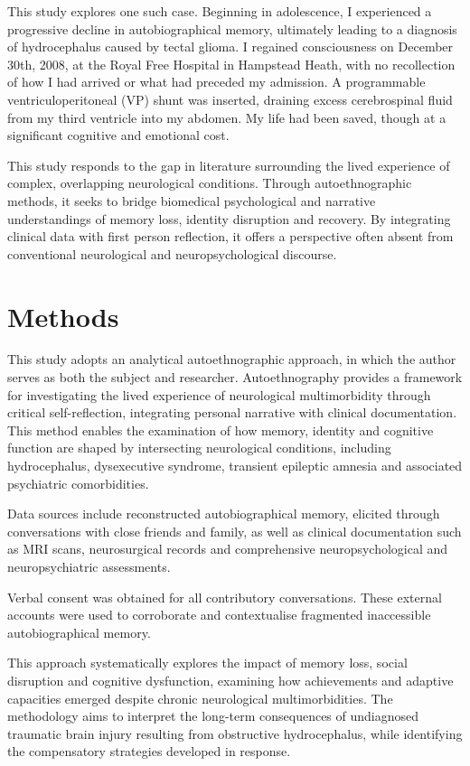 \documentclass{article}
\begin{document}
This study explores one such case. Beginning in adolescence, I experienced a progressive decline in autobiographical memory, ultimately leading to a diagnosis of hydrocephalus caused by tectal glioma. I regained consciousness on December 30th, 2008, at the Royal Free Hospital in Hampstead Heath, with no recollection of how I had arrived or what had preceded my admission. A programmable ventriculoperitoneal (VP) shunt was inserted, draining excess cerebrospinal fluid from my third ventricle into my abdomen. My life had been saved, though at a significant cognitive and emotional cost.

This study responds to the gap in literature surrounding the lived experience of complex, overlapping neurological conditions. Through autoethnographic methods, it seeks to bridge biomedical psychological and narrative understandings of memory loss, identity disruption and recovery. By integrating clinical data with first person reflection, it offers a perspective often absent from conventional neurological and neuropsychological discourse.

\section*{Methods}
This study adopts an analytical autoethnographic approach, in which the author serves as both the subject and researcher. Autoethnography provides a framework for investigating the lived experience of neurological multimorbidity through critical self-reflection, integrating personal narrative with clinical documentation. This method enables the examination of how memory, identity and cognitive function are shaped by intersecting
neurological conditions, including hydrocephalus, dysexecutive syndrome, transient epileptic amnesia and associated psychiatric comorbidities.

Data sources include reconstructed autobiographical memory, elicited through conversations with close friends and family, as well as clinical documentation such as MRI scans, neurosurgical records and comprehensive neuropsychological and neuropsychiatric assessments.

Verbal consent was obtained for all contributory conversations. These external accounts were used to corroborate and contextualise fragmented inaccessible autobiographical memory.

This approach systematically explores the impact of memory loss, social disruption and cognitive dysfunction, examining how achievements and adaptive capacities emerged despite chronic neurological multimorbidities. The methodology aims to interpret the long-term consequences of undiagnosed traumatic brain injury resulting from obstructive hydrocephalus, while identifying the compensatory strategies developed in response.
\end{document}
